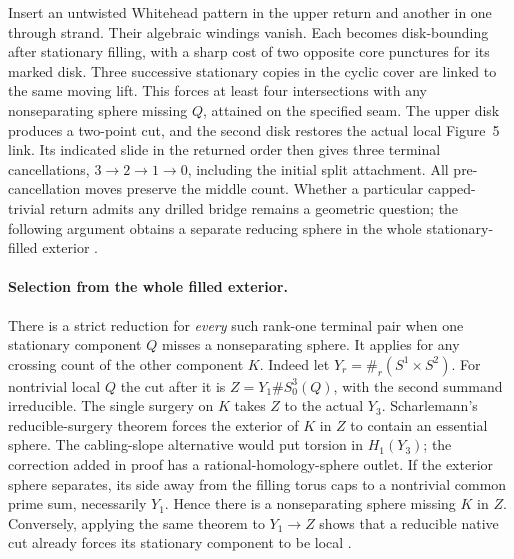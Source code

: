 \documentclass[11pt,letterpaper]{article}
\numberwithin{equation}{section}
\begin{document}
Insert an untwisted Whitehead pattern in the upper return and another
in one through strand. Their algebraic windings vanish. Each
becomes disk-bounding after stationary filling, with a sharp cost
of two opposite core punctures for its marked disk. Three successive
stationary copies in the cyclic cover are linked to the same moving
lift. This forces at least four intersections with any nonseparating
sphere missing \(Q\), attained on the specified seam. The upper disk
produces a two-point cut, and the second disk restores the actual
local Figure~5 link. Its indicated slide in the returned order then
gives three terminal cancellations, \(3\to2\to1\to0\), including
the initial split attachment. All pre-cancellation moves preserve
the middle count. Whether a particular capped-trivial return admits any drilled bridge
remains a geometric question; the following argument obtains a separate
reducing sphere in the whole stationary-filled exterior \cite{Baker2026HandleCuts}.

\paragraph{Selection from the whole filled exterior.}
There is a strict reduction for \emph{every} such rank-one terminal
pair when one stationary component \(Q\) misses a nonseparating sphere.
It applies for any crossing count of the other component \(K\).
Indeed let \(Y_r=\#_r(S^1\times S^2)\). For nontrivial local \(Q\) the
cut after it is \(Z=Y_1\#S^3_0(Q)\), with the second summand irreducible.
The single surgery on \(K\) takes \(Z\) to the actual \(Y_3\).
Scharlemann's reducible-surgery theorem forces the exterior of \(K\)
in \(Z\) to contain an essential sphere. The cabling-slope alternative
would put torsion in \(H_1(Y_3)\); the correction added in proof has
a rational-homology-sphere outlet. If the exterior sphere separates,
its side away from the filling torus caps to a nontrivial common
prime sum, necessarily \(Y_1\). Hence there is a nonseparating sphere
missing \(K\) in \(Z\). Conversely, applying the same theorem to
\(Y_1\to Z\) shows that a reducible native cut already forces its
stationary component to be local
\cite[Theorem 6.1 and added correction]{Scharlemann1990Reducible}
\cite[Corollary 8.3]{Gabai1987FoliationsIII}.
\end{document}
